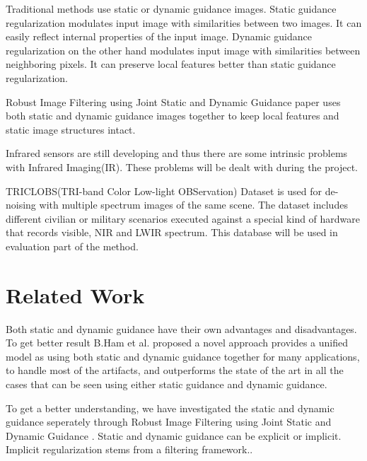 \documentclass[10pt,twocolumn,letterpaper]{article}
\begin{document}
Traditional methods use static or dynamic guidance images. Static guidance regularization modulates input image with similarities between two images. It can easily reflect internal properties of the input image.
Dynamic guidance regularization on the other hand modulates input image with similarities between neighboring pixels. It can preserve local features better than static guidance regularization.

Robust Image Filtering using Joint Static and Dynamic Guidance\cite{ham2015robust} paper uses both static and dynamic guidance images together to keep local features and static image structures intact.

Infrared sensors are still developing and thus there are some intrinsic problems with Infrared Imaging(IR). These problems will be dealt with during the project.

TRICLOBS(TRI-band Color Low-light OBServation) Dataset\cite{triclobs} is used for de-noising with multiple spectrum images of the same scene. The dataset includes different civilian or military scenarios executed against a special kind of hardware that records visible, NIR and LWIR spectrum. This database will be used in evaluation part of the method\cite{ham2015robust}.

\section{Related Work}

Both static and dynamic guidance have their own advantages and disadvantages. To get better result B.Ham et al.\cite{ham2015robust} proposed a novel approach provides a unified model as using both static and dynamic guidance together for many applications, to handle most of the artifacts, and outperforms the state of the art in all the cases that can be seen using either static guidance and dynamic guidance.

To get a better understanding, we have investigated the static and dynamic guidance seperately through Robust Image Filtering using Joint Static and Dynamic
Guidance\cite{ham2015robust} . Static and dynamic guidance can be explicit or implicit. Implicit regularization stems from a filtering framework.\cite{ham2015robust}. 
\end{document}

